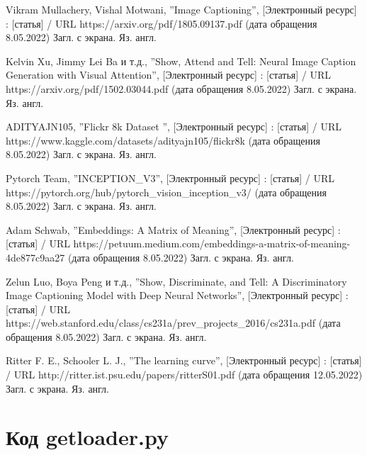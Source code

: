 \documentclass[bachelor, och, coursework]{SCWorks}
\begin{document}
\begin{thebibliography}{99}
     Vikram Mullachery, Vishal Motwani, ''Image Captioning'',
    [Электронный ресурс] : [статья] / URL https://arxiv.org/pdf/1805.09137.pdf
    (дата обращения 8.05.2022) Загл. с экрана. Яз. англ.

     Kelvin Xu, Jimmy Lei Ba и т.д., ''Show, Attend and
    Tell: Neural Image Caption Generation with Visual Attention'', [Электронный
    ресурс] : [статья] / URL https://arxiv.org/pdf/1502.03044.pdf (дата
    обращения 8.05.2022) Загл. с экрана. Яз. англ.

     ADITYAJN105, ''Flickr 8k Dataset '', [Электронный ресурс]
    : [статья] / URL https://www.kaggle.com/datasets/adityajn105/flickr8k (дата
    обращения 8.05.2022) Загл. с экрана. Яз. англ.


     Pytorch Team, ''INCEPTION_V3'', [Электронный ресурс] :
    [статья] / URL https://pytorch.org/hub/pytorch_vision_inception_v3/ (дата
    обращения 8.05.2022) Загл. с экрана. Яз. англ.


     Adam Schwab, ''Embeddings: A Matrix of Meaning'',
    [Электронный ресурс] : [статья] / URL
    https://petuum.medium.com/embeddings-a-matrix-of-meaning-4de877c9aa27 (дата
    обращения 8.05.2022) Загл. с экрана. Яз. англ.

     Zelun Luo, Boya Peng и т.д., ''Show, Discriminate,
    and Tell: A Discriminatory Image Captioning Model with Deep Neural
    Networks'', [Электронный ресурс] : [статья] / URL
    https://web.stanford.edu/class/cs231a/prev_projects_2016/cs231a.pdf (дата
    обращения 8.05.2022) Загл. с экрана. Яз. англ.

    
     Ritter F. E., Schooler L. J., ''The learning curve'',
    [Электронный ресурс] : [статья] / URL
    http://ritter.ist.psu.edu/papers/ritterS01.pdf (дата обращения 12.05.2022)
    Загл. с экрана. Яз. англ.


\end{thebibliography}

\appendix

    \section{Код getloader.py}
    \inputminted[fontsize=\footnotesize]{text}{model-ver-2/getloader.py}
\end{document}
